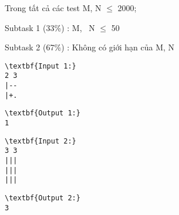 Trong tất cả các test M, N  $\le$  2000;

Subtask 1 (33\%) : M,  N  $\le$  50

Subtask 2 (67\%) : Không có giới hạn của M, N
\begin{verbatim}
\textbf{Input 1:}
2 3
|--
|+.\end{verbatim}
\begin{verbatim}
\textbf{Output 1:}
1\end{verbatim}
\begin{verbatim}
\textbf{Input 2:}
3 3
|||
|||
|||\end{verbatim}
\begin{verbatim}
\textbf{Output 2:}
3\end{verbatim}